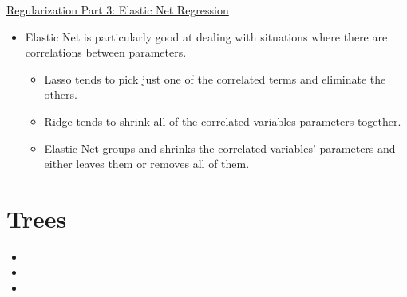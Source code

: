 \documentclass[12pt, titlepage, french]{report}
\begin{document}
\begin{YTB_SUMM_AUTO_NUMB}[label = {SQ-reg-3-elasticnet}]{\href{https://www.youtube.com/watch?v=1dKRdX9bfIo&feature=youtu.be}{Regularization Part 3: Elastic Net Regression}}
\begin{itemize}[leftmargin = *]
\begin{center}
\begin{tabular}{|	c	|	c	|	c	|}
			$\lambda_{1} = 0$	&	$\lambda_{2} > 0$	&	Ridge 	\\
			$\lambda_{1} > 0$	&	$\lambda_{2} > 0$	&	Elastic Net 	\\\hline
			\end{tabular}
		\end{center}
	\item	Elastic Net is particularly good at dealing with situations where there are correlations between parameters.
		\begin{itemize}
		\item	Lasso tends to pick just one of the correlated terms and eliminate the others.
		\item	Ridge tends to shrink all of the correlated variables parameters together.
		\item	Elastic Net groups and shrinks the correlated variables’ parameters and either leaves them or removes all of them.
		\end{itemize}
\end{itemize}
\end{YTB_SUMM_AUTO_NUMB}

\section*{Trees}

\begin{YTB_vids}
\begin{itemize}
	\item	{}
	\item	{}
	\item	{}
\end{itemize}
\end{YTB_vids}
\end{document}
